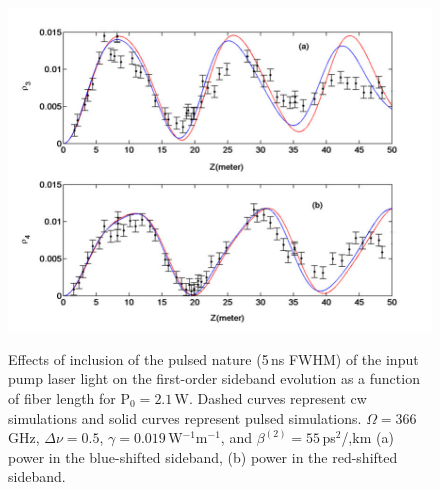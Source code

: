 \begin{figure}
\begin{center}
\includegraphics[width=5in]{nlsez21cwpulse.pdf}
\end{center}
\renewcommand{\baselinestretch}{1}
\small\normalsize
\begin{quote}
\caption[Effects of inclusion of the pulsed nature]
{Effects of inclusion of the pulsed nature (5\,ns FWHM) of the input pump laser light on the first-order sideband evolution as a function of fiber length for P$_0 = 2.1$\,W. Dashed curves represent cw simulations and solid curves represent pulsed simulations. $\Omega = 366$\,GHz, $\Delta\nu = 0.5$, $\gamma = 0.019$\,W$^{-1}$m$^{-1}$, and $\beta^{(2)} = 55$\,ps$^2$/,km (a) power in the blue-shifted sideband, (b) power in the red-shifted sideband.}
\label{figA.4}
\end{quote}
\end{figure}
\renewcommand{\baselinestretch}{1}
\small\normalsize

